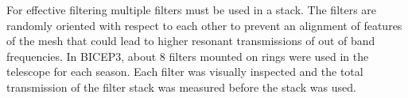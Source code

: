 \documentclass[12pt]{article}
\begin{document}
For effective filtering multiple filters must be used in a stack. The filters are randomly oriented with respect to each other to prevent an alignment of features of the mesh that could lead to higher resonant transmissions of out of band frequencies. In BICEP3, about 8 filters mounted on rings were used in the telescope for each season. Each filter was visually inspected and the total transmission of the filter stack was measured before the stack was used.  



\end{document}
